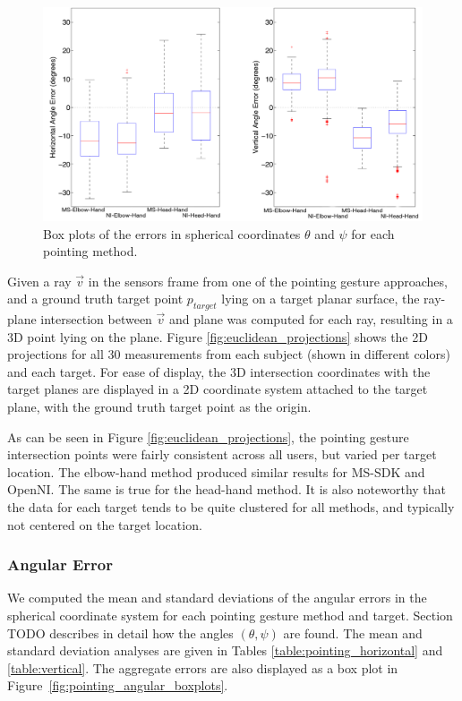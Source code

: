 \documentclass[12pt]{gatech-thesis}
\begin{document}
\begin{figure}[ht!]%
\centering
\includegraphics[width=1.0\textwidth]{pics/boxplots_largerfont}
\caption{Box plots of the errors in spherical coordinates $\theta$ and $\psi$ for each pointing method.}
\label{fig:angular_boxplots}
\end{figure}

Given a ray $\vec{v}$ in the sensors frame from one of the pointing gesture approaches, and a ground truth target point $p_{target}$ lying on a target planar surface, the ray-plane intersection between $\vec{v}$ and plane was computed for each ray, resulting in a 3D point lying on the plane. Figure \ref{fig:euclidean_projections} shows the 2D projections for all 30 measurements from each subject (shown in different colors) and each target. For ease of display, the 3D intersection coordinates with the target planes are displayed in a 2D coordinate system attached to the target plane, with the ground truth target point as the origin.  

As can be seen in Figure \ref{fig:euclidean_projections},  the pointing gesture intersection points were fairly consistent across all users, but varied per target location.  The elbow-hand method produced similar results for MS-SDK and OpenNI. The same is true for the head-hand method.  It is also noteworthy that the data for each target tends to be quite clustered for all methods, and typically not centered on the target location.

\subsubsection{Angular Error}
\label{sec:pointing_angular_error}

We computed the mean and standard deviations of the angular errors in the spherical coordinate system for each pointing gesture method and target. Section TODO describes in detail how the angles $(\theta, \psi)$ are found. The mean and standard deviation analyses are given in Tables \ref{table:pointing_horizontal} and \ref{table:vertical}.  The aggregate errors are also displayed as a  box plot in Figure~\ref{fig:pointing_angular_boxplots}.
\end{document}
